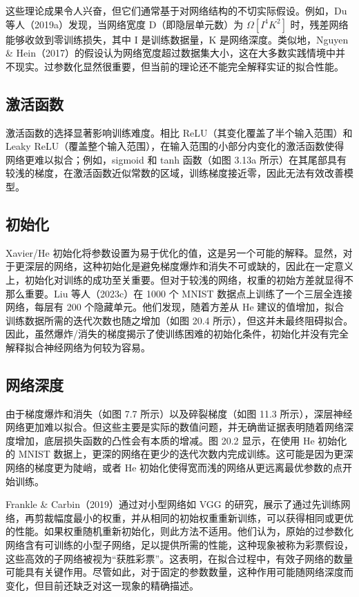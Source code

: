 这些理论成果令人兴奋，但它们通常基于对网络结构的不切实际假设。例如，Du 等人（2019a）发现，当网络宽度 D（即隐层单元数）为 \(\Omega [I^4K^2]\) 时，残差网络能够收敛到零训练损失，其中 I 是训练数据量，K 是网络深度。类似地，Nguyen \& Hein（2017）的假设认为网络宽度超过数据集大小，这在大多数实践情境中并不现实。过参数化显然很重要，但当前的理论还不能完全解释实证的拟合性能。

\subsection{激活函数}
激活函数的选择显著影响训练难度。相比 ReLU（其变化覆盖了半个输入范围）和 Leaky ReLU（覆盖整个输入范围），在输入范围的小部分内变化的激活函数使得网络更难以拟合；例如，sigmoid 和 tanh 函数（如图 3.13a 所示）在其尾部具有较浅的梯度，在激活函数近似常数的区域，训练梯度接近零，因此无法有效改善模型。

\subsection{初始化}
Xavier/He 初始化将参数设置为易于优化的值，这是另一个可能的解释。显然，对于更深层的网络，这种初始化是避免梯度爆炸和消失不可或缺的，因此在一定意义上，初始化对训练的成功至关重要。但对于较浅的网络，权重的初始方差就显得不那么重要。Liu 等人（2023c）在 1000 个 MNIST 数据点上训练了一个三层全连接网络，每层有 200 个隐藏单元。他们发现，随着方差从 He 建议的值增加，拟合训练数据所需的迭代次数也随之增加（如图 20.4 所示），但这并未最终阻碍拟合。因此，虽然爆炸/消失的梯度揭示了使训练困难的初始化条件，初始化并没有完全解释拟合神经网络为何较为容易。

\subsection{网络深度}
由于梯度爆炸和消失（如图 7.7 所示）以及碎裂梯度（如图 11.3 所示），深层神经网络更加难以拟合。但这些主要是实际的数值问题，并无确凿证据表明随着网络深度增加，底层损失函数的凸性会有本质的增减。图 20.2 显示，在使用 He 初始化的 MNIST 数据上，更深的网络在更少的迭代次数内完成训练。这可能是因为更深网络的梯度更为陡峭，或者 He 初始化使得宽而浅的网络从更远离最优参数的点开始训练。

Frankle \& Carbin（2019）通过对小型网络如 VGG 的研究，展示了通过先训练网络，再剪裁幅度最小的权重，并从相同的初始权重重新训练，可以获得相同或更优的性能。如果权重随机重新初始化，则此方法不适用。他们认为，原始的过参数化网络含有可训练的小型子网络，足以提供所需的性能，这种现象被称为彩票假设，这些高效的子网络被视为“获胜彩票”。这表明，在拟合过程中，有效子网络的数量可能具有关键作用。尽管如此，对于固定的参数数量，这种作用可能随网络深度而变化，但目前还缺乏对这一现象的精确描述。

